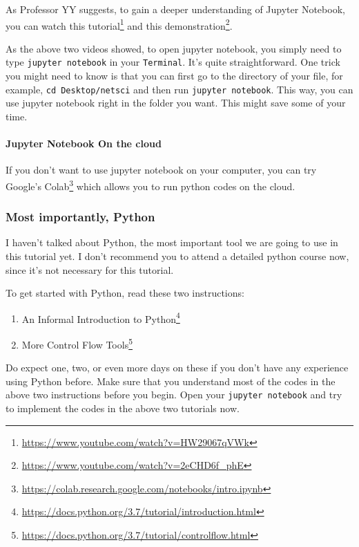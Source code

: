 \documentclass[
]{krantz}
\providecommand{\tightlist}{%
  \setlength{\itemsep}{0pt}\setlength{\parskip}{0pt}}
\renewcommand{\href}[2]{#2\footnote{\url{#1}}}
\begin{document}
As Professor YY suggests, to gain a deeper understanding of Jupyter Notebook, you can watch \href{https://www.youtube.com/watch?v=HW29067qVWk}{this tutorial} and \href{https://www.youtube.com/watch?v=2eCHD6f_phE}{this demonstration}.

As the above two videos showed, to open jupyter notebook, you simply need to type \texttt{jupyter\ notebook} in your \texttt{Terminal}. It's quite straightforward. One trick you might need to know is that you can first go to the directory of your file, for example, \texttt{cd\ Desktop/netsci} and then run \texttt{jupyter\ notebook}. This way, you can use jupyter notebook right in the folder you want. This might save some of your time.

\hypertarget{jupyter-notebook-on-the-cloud}{%
\paragraph{Jupyter Notebook On the cloud}\label{jupyter-notebook-on-the-cloud}}

If you don't want to use jupyter notebook on your computer, you can try \href{https://colab.research.google.com/notebooks/intro.ipynb}{Google's Colab} which allows you to run python codes on the cloud.

\hypertarget{most-importantly-python}{%
\subsubsection{Most importantly, Python}\label{most-importantly-python}}

I haven't talked about Python, the most important tool we are going to use in this tutorial yet. I don't recommend you to attend a detailed python course now, since it's not necessary for this tutorial.

To get started with Python, read these two instructions:

\begin{enumerate}
\def\labelenumi{\arabic{enumi}.}
\tightlist
\item
  \href{https://docs.python.org/3.7/tutorial/introduction.html}{An Informal Introduction to Python}
\item
  \href{https://docs.python.org/3.7/tutorial/controlflow.html}{More Control Flow Tools}
\end{enumerate}

Do expect one, two, or even more days on these if you don't have any experience using Python before. Make sure that you understand most of the codes in the above two instructions before you begin. Open your \texttt{jupyter\ notebook} and try to implement the codes in the above two tutorials now.
\end{document}

